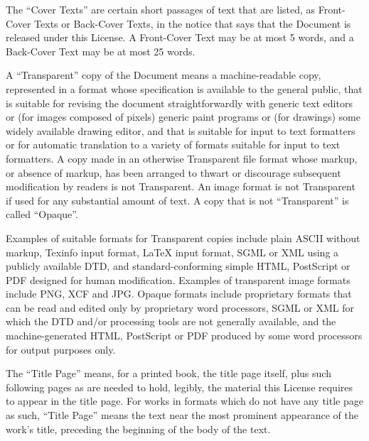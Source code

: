 {\tiny{}The \textquotedblleft Cover Texts\textsf{''} are certain short passages
of text that are listed, as Front-Cover Texts or Back-Cover Texts,
in the notice that says that the Document is released under this License.
A Front-Cover Text may be at most 5 words, and a Back-Cover Text may
be at most 25 words.}{\tiny\par}

{\tiny{}A \textquotedblleft Transparent\textsf{''} copy of the Document means
a machine-readable copy, represented in a format whose specification
is available to the general public, that is suitable for revising
the document straightforwardly with generic text editors or (for images
composed of pixels) generic paint programs or (for drawings) some
widely available drawing editor, and that is suitable for input to
text formatters or for automatic translation to a variety of formats
suitable for input to text formatters. A copy made in an otherwise
Transparent file format whose markup, or absence of markup, has been
arranged to thwart or discourage subsequent modification by readers
is not Transparent. An image format is not Transparent if used for
any substantial amount of text. A copy that is not \textquotedblleft Transparent\textsf{''}
is called \textquotedblleft Opaque\textsf{''}.}{\tiny\par}

{\tiny{}Examples of suitable formats for Transparent copies include
plain ASCII without markup, Texinfo input format, \LaTeX{} input format,
SGML or XML using a publicly available DTD, and standard-conforming
simple HTML, PostScript or PDF designed for human modification. Examples
of transparent image formats include PNG, XCF and JPG. Opaque formats
include proprietary formats that can be read and edited only by proprietary
word processors, SGML or XML for which the DTD and/or processing tools
are not generally available, and the machine-generated HTML, PostScript
or PDF produced by some word processors for output purposes only.}{\tiny\par}

{\tiny{}The \textsf{``}Title Page\textsf{''} means, for a printed book, the title
page itself, plus such following pages as are needed to hold, legibly,
the material this License requires to appear in the title page. For
works in formats which do not have any title page as such, \textquotedblleft Title
Page\textquotedblright{} means the text near the most prominent appearance
of the work\textsf{'}s title, preceding the beginning of the body of the text.}{\tiny\par}

